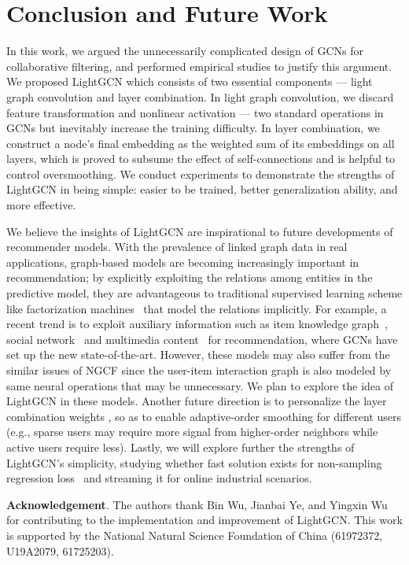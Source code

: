 \documentclass[sigconf]{acmart}
\theoremstyle{definition}
\begin{document}
 \section{Conclusion and Future Work} \label{sec:conclusion}
In this work, we argued the unnecessarily complicated design of GCNs for collaborative filtering, and performed empirical studies to justify this argument. 
We proposed LightGCN which consists of two essential components --- light graph convolution and layer combination. 
In light graph convolution, we 
discard feature transformation and nonlinear activation --- two standard operations in GCNs but inevitably increase the training difficulty. In layer combination, we construct a node's final embedding as the weighted sum of its embeddings on all layers, which is proved to subsume the effect of self-connections and is helpful to control oversmoothing. 
We conduct experiments to demonstrate the strengths of LightGCN in being simple: easier to be trained, better generalization ability, and more effective. 

We believe the insights of LightGCN are inspirational to future developments of recommender models. With the prevalence of linked graph data in real applications, graph-based models are becoming increasingly important in recommendation;
by explicitly exploiting the relations among entities in the predictive model, they are advantageous to traditional supervised learning scheme like factorization machines~\cite{FM,NFM} that model the relations implicitly. 
For example, a recent trend is to exploit auxiliary information such as item knowledge graph~\cite{KGAT}, social network~\cite{GCNSocial} and multimedia content~\cite{MMGCN} for recommendation, where GCNs have set up the new state-of-the-art. 
However, these models may also suffer from the similar issues of NGCF since the user-item interaction graph is also modeled by same neural operations that may be unnecessary. We plan to explore the idea of LightGCN in these models. Another future direction is to personalize the layer combination weights , so as to enable adaptive-order smoothing for different users (e.g., sparse users may require more signal from higher-order neighbors while active users require less). Lastly, we will explore further the strengths of LightGCN's simplicity, studying whether fast solution exists for non-sampling regression loss~\cite{he2019fast} and streaming it for online industrial scenarios. 

\noindent\textbf{Acknowledgement}. The authors thank Bin Wu, Jianbai Ye, and Yingxin Wu for contributing to the implementation and improvement of LightGCN. This work is supported by the National Natural Science Foundation of China (61972372, U19A2079, 61725203). 


\balance


\balance
\scriptsize
\end{document}
